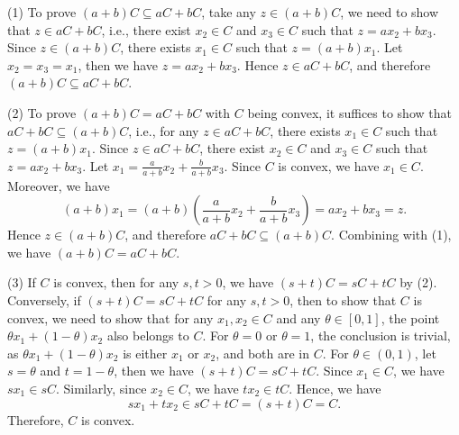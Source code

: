 \documentclass[12pt,a4paper]{article}
\begin{document}
\begin{problem}
    (1) To prove $(a+b)C \subseteq aC+bC$, take any $z\in (a+b)C$, we need to show that $z\in aC+bC$, i.e., there exist $x_2\in C$ and $x_3\in C$ such that $z=ax_2+bx_3$. Since $z\in (a+b)C$, there exists $x_1\in C$ such that $z=(a+b)x_1$. Let $x_2=x_3=x_1$, then we have $z=ax_2+bx_3$. Hence $z\in aC+bC$, and therefore $(a+b)C \subseteq aC+bC$.

    (2) To prove $(a+b)C = aC+bC$ with $C$ being convex, it suffices to show that $aC+bC \subseteq (a+b)C$, i.e., for any $z\in aC+bC$, there exists $x_1\in C$ such that $z=(a+b)x_1$. Since $z\in aC+bC$, there exist $x_2\in C$ and $x_3\in C$ such that $z=ax_2+bx_3$. Let $x_1=\frac{a}{a+b}x_2+\frac{b}{a+b}x_3$. Since $C$ is convex, we have $x_1\in C$. Moreover, we have
    \[
    (a+b)x_1=(a+b)\left(\frac{a}{a+b}x_2+\frac{b}{a+b}x_3\right)=ax_2+bx_3=z.
    \]
    Hence $z\in (a+b)C$, and therefore $aC+bC \subseteq (a+b)C$. Combining with (1), we have $(a+b)C = aC+bC$.

    (3) If $C$ is convex, then for any $s,t>0$, we have $(s+t)C=sC+tC$ by (2). Conversely, if $(s+t)C=sC+tC$ for any $s,t>0$, then to show that $C$ is convex, we need to show that for any $x_1,x_2\in C$ and any $\theta\in[0,1]$, the point $\theta x_1+(1-\theta)x_2$ also belongs to $C$. For $\theta = 0$ or $\theta = 1$, the conclusion is trivial, as $\theta x_1+(1-\theta)x_2$ is either $x_1$ or $x_2$, and both are in $C$. For $\theta\in(0,1)$, let $s=\theta$ and $t=1-\theta$, then we have $(s+t)C=sC+tC$. Since $x_1\in C$, we have $sx_1\in sC$. Similarly, since $x_2\in C$, we have $tx_2\in tC$. Hence, we have
    \[
    sx_1+tx_2\in sC+tC=(s+t)C=C.
    \]
    Therefore, $C$ is convex.
    
\end{problem}
\end{document}
